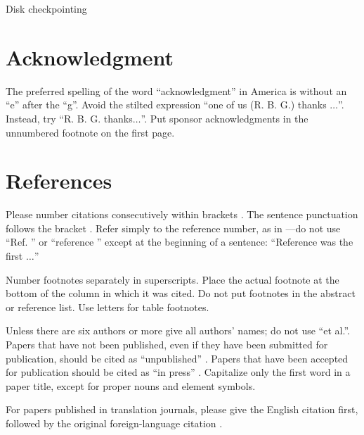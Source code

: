 \documentclass[conference]{IEEEtran}
\begin{document}
Disk checkpointing

\section*{Acknowledgment}

The preferred spelling of the word ``acknowledgment'' in America is without 
an ``e'' after the ``g''. Avoid the stilted expression ``one of us (R. B. 
G.) thanks $\ldots$''. Instead, try ``R. B. G. thanks$\ldots$''. Put sponsor 
acknowledgments in the unnumbered footnote on the first page.

\section*{References}

Please number citations consecutively within brackets \cite{b1}. The 
sentence punctuation follows the bracket \cite{b2}. Refer simply to the reference 
number, as in \cite{b3}---do not use ``Ref. \cite{b3}'' or ``reference \cite{b3}'' except at 
the beginning of a sentence: ``Reference \cite{b3} was the first $\ldots$''

Number footnotes separately in superscripts. Place the actual footnote at 
the bottom of the column in which it was cited. Do not put footnotes in the 
abstract or reference list. Use letters for table footnotes.

Unless there are six authors or more give all authors' names; do not use 
``et al.''. Papers that have not been published, even if they have been 
submitted for publication, should be cited as ``unpublished'' \cite{b4}. Papers 
that have been accepted for publication should be cited as ``in press'' \cite{b5}. 
Capitalize only the first word in a paper title, except for proper nouns and 
element symbols.

For papers published in translation journals, please give the English 
citation first, followed by the original foreign-language citation \cite{b6}.
\end{document}
